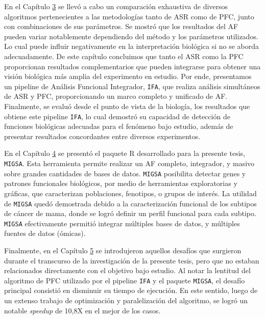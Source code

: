 \documentclass[12pt,twoside]{reedthesis}
\begin{document}
\par

En el Capítulo \protect\hyperlink{cap:ifa}{3} se llevó a cabo un comparación exhaustiva de diversos algoritmos pertenecientes a las metodologías tanto de ASR como de PFC, junto con combinaciones de sus parámetros. Se mostró que los resultados del AF pueden variar notablemente dependiendo del método y los parámetros utilizados. Lo cual puede influir negativamente en la interpretación biológica si no se aborda adecuadamente. De este capítulo concluimos que tanto el ASR como la PFC proporcionan resultados complementarios que pueden integrarse para obtener una visión biológica más amplia del experimento en estudio. Por ende, presentamos un pipeline de Análisis Funcional Integrador, \texttt{IFA}, que realiza análisis simultáneos de ASR y PFC, proporcionando un marco completo y unificado de AF. Finalmente, se evaluó desde el punto de vista de la biología, los resultados que obtiene este pipeline \texttt{IFA}, lo cual demostró su capacidad de detección de funciones biológicas adecuadas para el fenómeno bajo estudio, además de presentar resultados concordantes entre diversos experimentos.

\par

En el Capítulo \protect\hyperlink{cap:migsa}{4} se presentó el paquete R desarrollado para la presente tesis, \texttt{MIGSA}. Esta herramienta permite realizar un AF completo, integrador, y masivo sobre grandes cantidades de bases de datos. \texttt{MIGSA} posibilita detectar genes y patrones funcionales biológicos, por medio de herramientas exploratorias y gráficas, que caracterizan poblaciones, fenotipos, o grupos de interés. La utilidad de \texttt{MIGSA} quedó demostrada debido a la caracterización funcional de los subtipos de cáncer de mama, donde se logró definir un perfil funcional para cada subtipo. \texttt{MIGSA} efectivamente permitió integrar múltiples bases de datos, y múltiples fuentes de datos (ómicas).

\par

Finalmente, en el Capítulo \protect\hyperlink{cap:desafios}{5} se introdujeron aquellos desafíos que surgieron durante el transcurso de la investigación de la presente tesis, pero que no estaban relacionados directamente con el objetivo bajo estudio. Al notar la lentitud del algoritmo de PFC utilizado por el pipeline \texttt{IFA} y el paquete \texttt{MIGSA}, el desafío principal consistió en disminuir su tiempo de ejecución. En este sentido, luego de un extenso trabajo de optimización y paralelización del algoritmo, se logró un notable \emph{speedup} de 10,8X en el mejor de los casos.
\end{document}
